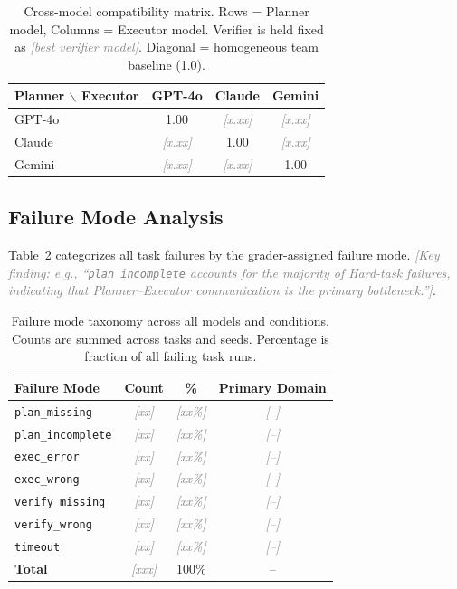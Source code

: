 \documentclass{article}
\newcommand{\placeholder}[1]{\textcolor{gray}{\textit{[#1]}}}
\newcommand{\sys}[1]{\texttt{#1}}
\begin{document}
\begin{table}[h]
\centering
\caption{Cross-model compatibility matrix. Rows = Planner model,
  Columns = Executor model. Verifier is held fixed as
  \placeholder{best verifier model}. Diagonal = homogeneous team baseline (1.0).}
\label{tab:compat}
\small
\begin{tabular}{lccc}
\toprule
\textbf{Planner $\backslash$ Executor} & \textbf{GPT-4o} & \textbf{Claude} & \textbf{Gemini} \\
\midrule
GPT-4o  & 1.00 & \placeholder{x.xx} & \placeholder{x.xx} \\
Claude  & \placeholder{x.xx} & 1.00 & \placeholder{x.xx} \\
Gemini  & \placeholder{x.xx} & \placeholder{x.xx} & 1.00 \\
\bottomrule
\end{tabular}
\end{table}

\subsection{Failure Mode Analysis}
\label{sec:results:failures}

Table~\ref{tab:failures} categorizes all task failures by the grader-assigned
failure mode. \placeholder{Key finding: e.g., ``\sys{plan\_incomplete}
accounts for the majority of Hard-task failures, indicating that
Planner--Executor communication is the primary bottleneck.''}.

\begin{table}[h]
\centering
\caption{Failure mode taxonomy across all models and conditions. Counts are
  summed across tasks and seeds. Percentage is fraction of all failing
  task runs.}
\label{tab:failures}
\small
\begin{tabular}{lccc}
\toprule
\textbf{Failure Mode} & \textbf{Count} & \textbf{\%} & \textbf{Primary Domain} \\
\midrule
\sys{plan\_missing}    & \placeholder{xx} & \placeholder{xx\%} & \placeholder{--} \\
\sys{plan\_incomplete} & \placeholder{xx} & \placeholder{xx\%} & \placeholder{--} \\
\sys{exec\_error}      & \placeholder{xx} & \placeholder{xx\%} & \placeholder{--} \\
\sys{exec\_wrong}      & \placeholder{xx} & \placeholder{xx\%} & \placeholder{--} \\
\sys{verify\_missing}  & \placeholder{xx} & \placeholder{xx\%} & \placeholder{--} \\
\sys{verify\_wrong}    & \placeholder{xx} & \placeholder{xx\%} & \placeholder{--} \\
\sys{timeout}          & \placeholder{xx} & \placeholder{xx\%} & \placeholder{--} \\
\midrule
\textbf{Total}         & \placeholder{xxx} & 100\% & -- \\
\bottomrule
\end{tabular}
\end{table}
\end{document}
